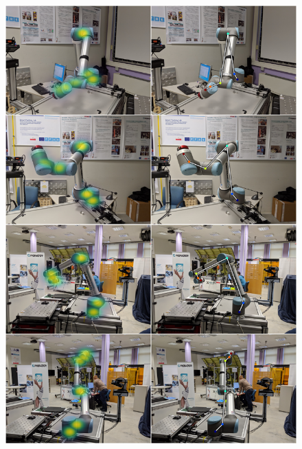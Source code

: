 \documentclass[conference]{IEEEtran}
\begin{document}
    \begin{figure}[htbp]
        \centerline{
            \iffinalcopy
                \includegraphics[width=0.98\columnwidth]{figures/results/ur10_lab/mosaic.png}
            \else
}
\end{figure}
\end{document}
